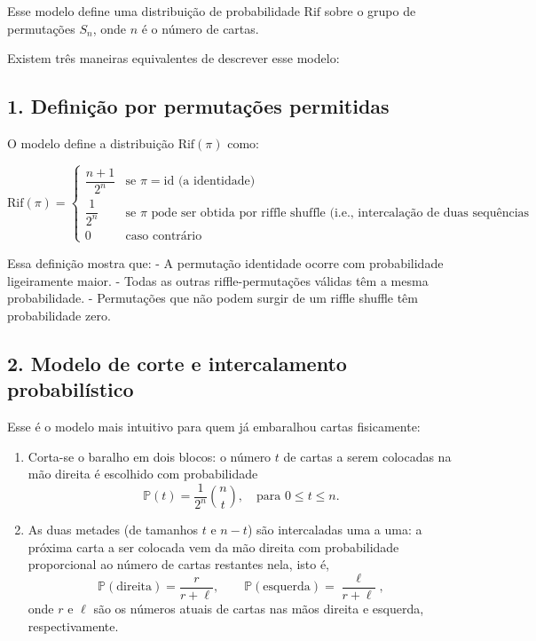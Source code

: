 \documentclass[12pt]{article}
\begin{document}
Esse modelo define uma distribuição de probabilidade $\text{Rif}$ sobre o grupo de permutações $S_n$, onde $n$ é o número de cartas.

Existem três maneiras equivalentes de descrever esse modelo:

\subsection*{1. Definição por permutações permitidas}

O modelo define a distribuição $\text{Rif}(\pi)$ como:

\[
\text{Rif}(\pi) = 
\begin{cases}
\dfrac{n+1}{2^n} & \text{se } \pi = \text{id} \text{ (a identidade)} \\
\dfrac{1}{2^n} & \text{se } \pi \text{ pode ser obtida por riffle shuffle (i.e., intercalação de duas sequências crescentes)} \\
0 & \text{caso contrário}
\end{cases}
\]

Essa definição mostra que:
- A permutação identidade ocorre com probabilidade ligeiramente maior.
- Todas as outras riffle-permutações válidas têm a mesma probabilidade.
- Permutações que não podem surgir de um riffle shuffle têm probabilidade zero.

\subsection*{2. Modelo de corte e intercalamento probabilístico}

Esse é o modelo mais intuitivo para quem já embaralhou cartas fisicamente:

\begin{enumerate}
    \item Corta-se o baralho em dois blocos: o número $t$ de cartas a serem colocadas na mão direita é escolhido com probabilidade
    \[
    \mathbb{P}(t) = \dfrac{1}{2^n} \binom{n}{t}, \quad \text{para } 0 \leq t \leq n.
    \]
    \item As duas metades (de tamanhos $t$ e $n-t$) são intercaladas uma a uma: a próxima carta a ser colocada vem da mão direita com probabilidade proporcional ao número de cartas restantes nela, isto é,
    \[
    \mathbb{P}(\text{direita}) = \dfrac{r}{r+\ell}, \qquad \mathbb{P}(\text{esquerda}) = \dfrac{\ell}{r+\ell},
    \]
    onde $r$ e $\ell$ são os números atuais de cartas nas mãos direita e esquerda, respectivamente.
\end{enumerate}
\end{document}
